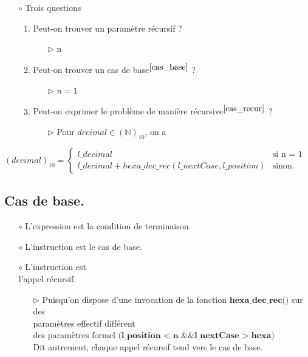 \documentclass[a4paper, 11pt, oneside]{article}
\begin{document}
		\begin{itemize}
			\item[$\circ$] Trois questions
			\begin{enumerate}
				\item Peut-on trouver un paramètre récursif ?
				\begin{itemize}
					\item[$\triangleright$] n
				\end{itemize}
				\item Peut-on trouver un cas de base$^{\ref{cas_base}}$ ?
				\begin{itemize}
					\item[$\triangleright$] $n = 1$
				\end{itemize}
				\item Peut-on exprimer le problème de manière récursive$^{\ref{cas_recur}}$ ?
				\begin{itemize}
					\item[$\triangleright$] Pour $decimal \in (\mathbb{N})_{10}$, on a
				\end{itemize}
			\end{enumerate} 
		\end{itemize}
		
		$
		(decimal)_{10} = \left\{
    	\begin{array}{ll}
        		l\_decimal & \mbox{si n = 1}  \\
        		l\_decimal + hexa\_dec\_rec(l\_nextCase, l\_position) & \mbox{sinon.}
    	\end{array}
		\right.
		$
	
	\subsection{Cas de base.}\label{cas_base}
	
		\begin{itemize}
			\item[$\circ$] L'expression  est la condition de terminaison.
			\item[$\circ$] L'instruction  est le cas de base.
			\item[$\circ$] L'instruction  est 
							\\ l’appel récursif.
			\begin{itemize}
				\item[$\triangleright$] Puisqu’on dispose d’une invocation de la fonction $\textbf{hexa\_dec\_rec()}$ sur des 
										\\ paramètres effectif différent 
										\\ des paramètres formel $\textbf{(l\_position < n \&\& l\_nextCase > hexa)}$ 
										\\ Dit autrement, chaque appel récursif tend vers le cas de base.
			\end{itemize}
		\end{itemize}
	
\end{document}
